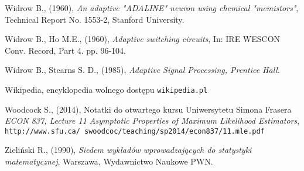 \begin{thebibliography}{99}
 Widrow B., (1960), \textit{An adaptive "ADALINE" neuron using chemical "memistors"}, Technical Report No. 1553-2, Stanford University.

 Widrow B., Ho M.E., (1960), \textit{Adaptive switching circuits}, In: IRE WESCON Conv.
Record, Part 4. pp. 96-104.

 Widrow B., Stearns S. D., (1985), \textit{Adaptive Signal Processing, Prentice Hall}.

 Wikipedia, encyklopedia wolnego dostępu \texttt{wikipedia.pl}

  Woodcock S., (2014), Notatki do otwartego kursu Uniwersytetu Simona Frasera \textit{ECON 837, Lecture 11 Asymptotic Properties of Maximum Likelihood Estimators}, \\ \texttt{http://www.sfu.ca/~swoodcoc/teaching/sp2014/econ837/11.mle.pdf}

 Zieliński R., (1990), \textit{Siedem wykładów wprowadzających do statystyki matematycznej}, Warszawa, Wydawnictwo Naukowe PWN.


\end{thebibliography}
